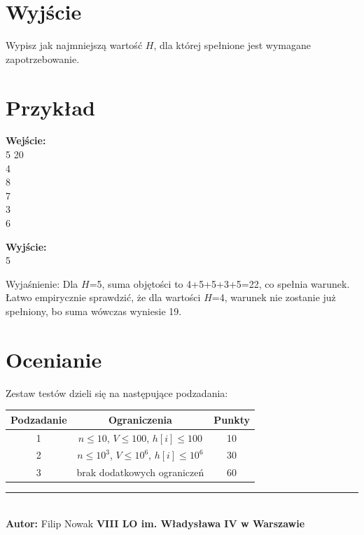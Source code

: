 \documentclass[a4paper,11pt]{article}
\newcommand{\tasktitle}{Dostawa Piwa}
\newcommand{\taskshort}{PIW}
\newcommand{\contestinfo}{Konkurs Świąteczny 2024 - Grupa Początkująca.}
\newcommand{\memorylimit}{256 MB}
\newcommand{\exampleinput}{5 20\\4\\8\\7\\3\\6}
\newcommand{\exampleoutput}{5}
\newcommand{\explanation}{Dla $H$=5, suma objętości to 4+5+5+3+5=22, co spełnia warunek. Łatwo empirycznie sprawdzić, że dla wartości $H$=4, warunek nie zostanie już spełniony, bo suma wówczas wyniesie 19.}
\newcommand{\subtasktable}{%
\begin{tabular}{|c|c|c|}
\hline
Podzadanie & Ograniczenia & Punkty \\
\hline
1 & $n \leq 10$, $V \leq 100$, $h[i] \leq 100$ & 10 \\
2 & $n \leq 10^3$,  $V \leq 10^6$, $h[i] \leq 10^6$ & 30 \\
3 & brak dodatkowych ograniczeń & 60 \\
\hline
\end{tabular}}
\begin{document}
\section*{Wyjście}
Wypisz jak najmniejszą wartość $H$, dla której spełnione jest wymagane zapotrzebowanie.
\newpage
\section*{Przykład}
\begin{multicols}{2}
\noindent\textbf{Wejście:} \\
\exampleinput

\columnbreak

\noindent\textbf{Wyjście:} \\
\exampleoutput
\end{multicols}

\noindent Wyjaśnienie: \explanation

\section*{Ocenianie}
Zestaw testów dzieli się na następujące podzadania:
\begin{center}
\subtasktable
\end{center}

\vspace*{\fill}
\noindent\rule{\textwidth}{0.4pt} \\
\small \textbf{Autor:} Filip Nowak \hfill \textbf{VIII LO im. Władysława IV w Warszawie}

\end{document}
